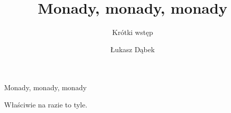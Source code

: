 \documentclass[17pt]{beamer}
\title[Monady]{Monady, monady, monady}
\subtitle{Krótki wstęp}
\author{Łukasz Dąbek}
\begin{document}
\begin{frame}[plain]
    \titlepage
\end{frame}

\begin{frame}{Monady, monady, monady}

Właściwie na razie to tyle.

\end{frame}
\end{document}
